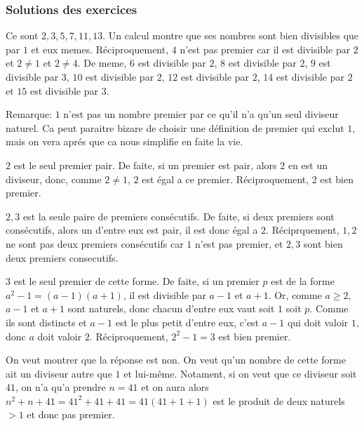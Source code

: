 \subsubsection{Solutions des exercices}
\sol

Ce sont \(2, 3, 5, 7, 11, 13\). Un calcul montre que ses nombres sont bien divisibles que par \(1\) et eux memes. Réciproquement, \(4\) n'est pas premier car il est divisible par \(2\) et \(2\not=1\) et \(2\not=4\). De meme, \(6\) est divisible par \(2\), \(8\) est divisible par \(2\), \(9\) est divisible par \(3\), \(10\) est divisible par \(2\), \(12\) est divisible par \(2\), \(14\) est divisible par \(2\) et \(15\) est divisible par \(3\).

Remarque: \(1\) n'est pas un nombre premier par ce qu'il n'a qu'un seul diviseur naturel. Ca peut paraitre bizare de choisir une définition de premier qui exclut \(1\), mais on vera aprés que ca nous simplifie en faite la vie.

\sol

\(2\) est le seul premier pair. De faite, si un premier est pair, alors \(2\) en est un diviseur, donc, comme \(2\not=1\), \(2\) est égal a ce premier. Réciproquement, \(2\) est bien premier.

\sol

\(2, 3\) est la seule paire de premiers consécutifs. De faite, si deux premiers sont consécutifs, alors un d'entre eux est pair, il est donc égal a \(2\). Réciprquement, \(1, 2\) ne sont pas deux premiers consécutifs car \(1\) n'est pas premier, et \(2, 3\) sont bien deux premiers consecutifs.

\sol

\(3\) est le seul premier de cette forme. De faite, si un premier \(p\) est de la forme \(a^2 - 1 = \left(a-1\right)\left(a+1\right)\), il est divisible par \(a-1\) et \(a+1\). Or, comme \(a\geqslant2\), \(a-1\) et \(a+1\) sont naturels, donc chacun d'entre eux vaut soit \(1\) soit \(p\). Comme ils sont distincts et \(a-1\) est le plus petit d'entre eux, c'est \(a-1\) qui doit valoir \(1\), donc \(a\) doit valoir \(2\). Réciproquement, \(2^2 - 1 = 3\) est bien premier.

\sol

On veut montrer que la réponse est non. On veut qu'un nombre de cette forme ait un diviseur autre que \(1\) et lui-même. Notament, si on veut que ce diviseur soit \(41\), on n'a qu'a prendre \(n=41\) et on aura alors \(n^2 + n + 41 = 41^2 + 41 + 41 = 41 \left(41 + 1 + 1\right)\) est le produit de deux naturels \(>1\) et donc pas premier.

